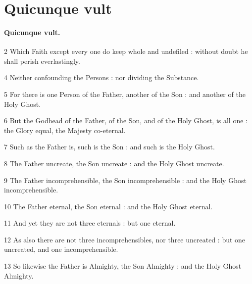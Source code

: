 \chapter{Quicunque vult}

\subsubsection{Quicunque vult.}

2 Which Faith except every one do keep whole and undefiled : without doubt he shall perish everlastingly.


4 Neither confounding the Persons : nor dividing the Substance.

5 For there is one Person of the Father, another of the Son : and another of the Holy Ghost.

6 But the Godhead of the Father, of the Son, and of the Holy Ghost, is all one : the Glory equal, the Majesty co-eternal.

7 Such as the Father is, such is the Son : and such is the Holy Ghost.

8 The Father uncreate, the Son uncreate : and the Holy Ghost uncreate.

9 The Father incomprehensible, the Son incomprehensible : and the Holy Ghost incomprehensible.

10 The Father eternal, the Son eternal : and the Holy Ghost eternal.

11 And yet they are not three eternals : but one eternal.

12 As also there are not three incomprehensibles, nor three uncreated : but one uncreated, and one incomprehensible.

13 So likewise the Father is Almighty, the Son Almighty : and the Holy Ghost Almighty.

